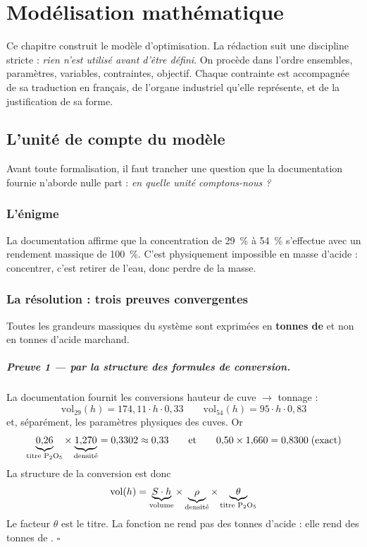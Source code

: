 \chapter{Modélisation mathématique}
\label{chap:modelisation}

Ce chapitre construit le modèle d'optimisation. La rédaction suit une discipline stricte :
\emph{rien n'est utilisé avant d'être défini}. On procède dans l'ordre ensembles,
paramètres, variables, contraintes, objectif. Chaque contrainte est accompagnée de sa
traduction en français, de l'organe industriel qu'elle représente, et de la justification de
sa forme.

\section{L'unité de compte du modèle}
\label{sec:unite}

Avant toute formalisation, il faut trancher une question que la documentation fournie
n'aborde nulle part : \emph{en quelle unité comptons-nous ?}

\subsection{L'énigme}

La documentation affirme que la concentration de \SI{29}{\percent} à \SI{54}{\percent}
s'effectue avec un rendement massique de \SI{100}{\percent}. C'est physiquement impossible
en masse d'acide : concentrer, c'est retirer de l'eau, donc perdre de la masse.

\subsection{La résolution : trois preuves convergentes}

\begin{proposition}
Toutes les grandeurs massiques du système sont exprimées en \textbf{tonnes de \PdeuxOcinq{}}
et non en tonnes d'acide marchand.
\end{proposition}

\paragraph{Preuve 1 --- par la structure des formules de conversion.}
La documentation fournit les conversions hauteur de cuve $\to$ tonnage :
\[
\mathrm{vol}_{29}(h) = 174{,}11 \cdot h \cdot 0{,}33
\qquad
\mathrm{vol}_{54}(h) = 95 \cdot h \cdot 0{,}83
\]
et, séparément, les paramètres physiques des cuves. Or
\[
\underbrace{0{,}26}_{\text{titre \ensuremath{\mathrm{P_2O_5}}{}}} \times \underbrace{1{,}270}_{\text{densité}} = 0{,}3302 \approx 0{,}33
\qquad\text{et}\qquad
0{,}50 \times 1{,}660 = 0{,}8300 \;\text{(exact)}
\]
La structure de la conversion est donc
\[
\mathrm{vol}(h) = \underbrace{S \cdot h}_{\text{volume}} \times \underbrace{\rho}_{\text{densité}} \times \underbrace{\theta}_{\text{titre \ensuremath{\mathrm{P_2O_5}}{}}}
\]
Le facteur $\theta$ est le titre. La fonction ne rend pas des tonnes d'acide : elle rend des
tonnes de \PdeuxOcinq{}. \hfill$\square$


